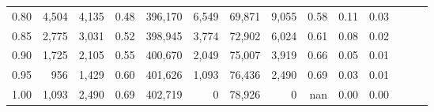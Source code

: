 \begin{tabular}{rrrrrrrrrrrrrr}
0.80 &   4,504 &  4,135 &  0.48 &  396,170 &    6,549 &  69,871 &   9,055 &  0.58 &  0.11 &      0.03 \\
0.85 &   2,775 &  3,031 &  0.52 &  398,945 &    3,774 &  72,902 &   6,024 &  0.61 &  0.08 &      0.02 \\
0.90 &   1,725 &  2,105 &  0.55 &  400,670 &    2,049 &  75,007 &   3,919 &  0.66 &  0.05 &      0.01 \\
0.95 &     956 &  1,429 &  0.60 &  401,626 &    1,093 &  76,436 &   2,490 &  0.69 &  0.03 &      0.01 \\
1.00 &   1,093 &  2,490 &  0.69 &  402,719 &        0 &  78,926 &       0 &   nan &  0.00 &      0.00 \\
\bottomrule
\end{tabular}
